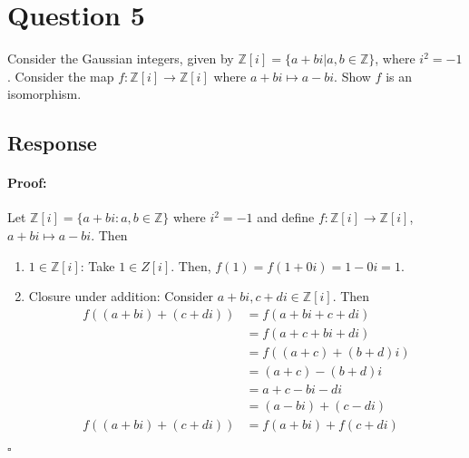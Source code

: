 \documentclass [12pt] {article}
\newcommand{\Z}{\mathbb{Z}}
\newenvironment{proof}{\paragraph{Proof:}}{\hfill$\square$}
\begin{document}
\section*{Question 5}
Consider the Gaussian integers, given by $\Z[i]=\{a+bi|a,b\in\Z\}$, where $i^2=-1$. Consider the map $f:\Z[i]\to \Z[i]$ where $a+bi\mapsto a-bi$. Show $f$ is an isomorphism.
\subsection*{Response}
\begin{proof}
    Let $\Z[i] = \{ a + bi : a, b \in \Z \}$ where $i^2 = -1$ and define $f : \Z[i] \to \Z[i]$, 
    $a + bi \mapsto a - bi$. Then
    \begin{enumerate}
        \item $1 \in \Z[i]$: Take $1 \in Z[i]$. Then, $f(1) = f(1 + 0i) = 1 - 0i = 1$.
        \item Closure under addition: Consider $a + bi, c + di \in \Z[i]$. Then
            \begin{align*}
                f((a + bi) + (c + di)) &= f(a + bi + c + di) \\
                                       &= f(a + c + bi + di) \\
                                       &= f((a + c) + (b + d)i) \\
                                       &= (a + c) - (b + d)i \\
                                       &= a + c - bi - di \\
                                       &= (a - bi) + (c - di) \\
                f((a + bi) + (c + di)) &= f(a + bi) + f(c + di)
            \end{align*}


\end{enumerate}
\end{proof}
\end{document}

